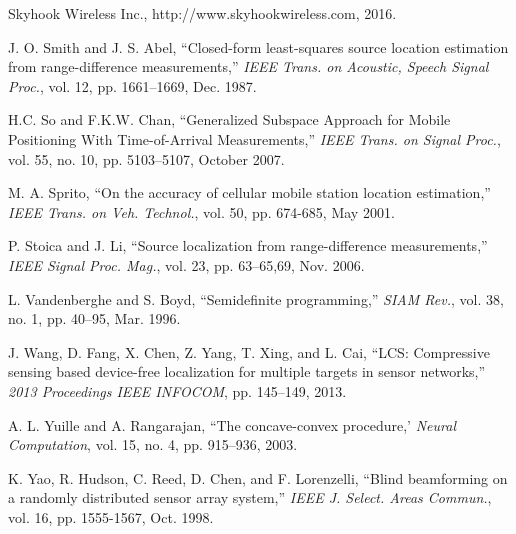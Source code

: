 \begin{thebibliography}{99}
Skyhook Wireless Inc., http://www.skyhookwireless.com, 2016.

 \label{r1}
J. O. Smith and J. S. Abel, ``Closed-form least-squares source location estimation from range-difference measurements,'' {\em IEEE Trans. on Acoustic, Speech Signal Proc.}, vol. 12, pp. 1661--1669, Dec. 1987.

H.C. So and F.K.W. Chan, ``Generalized Subspace Approach for Mobile Positioning With Time-of-Arrival Measurements,'' {\em IEEE Trans. on Signal Proc.}, vol. 55, no. 10, pp. 5103--5107, October 2007.

M. A. Sprito, ``On the accuracy of cellular mobile station location estimation,'' {\em IEEE Trans. on Veh. Technol.}, vol. 50, pp. 674-685, May 2001.


 \label{r14}
P. Stoica and J. Li, ``Source localization from range-difference measurements,'' {\em IEEE Signal Proc. Mag.}, vol. 23, pp. 63--65,69, Nov. 2006.


 \label{r12}
L. Vandenberghe and S. Boyd, ``Semidefinite programming,'' {\em SIAM Rev.}, vol. 38, no. 1, pp. 40--95, Mar. 1996.

J. Wang, D. Fang, X. Chen, Z. Yang, T. Xing, and L. Cai, ``LCS: Compressive sensing based device-free localization for multiple targets in sensor networks,'' {\em 2013 Proceedings IEEE INFOCOM}, pp. 145--149, 2013.

A. L. Yuille and A. Rangarajan, ``The concave-convex procedure,' {\em Neural Computation}, vol. 15, no. 4, pp. 915--936, 2003.

 \label{r6}
K. Yao, R. Hudson, C. Reed, D. Chen, and F. Lorenzelli, ``Blind beamforming on a randomly distributed sensor array system,'' {\em IEEE J. Select. Areas Commun.}, vol. 16, pp. 1555-1567, Oct. 1998.




\end{thebibliography}